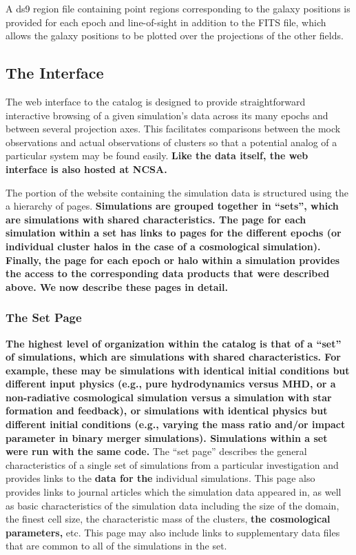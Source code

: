 \documentclass{emulateapj}
\begin{document}
A ds9 region file containing point regions corresponding to the galaxy positions is provided for each epoch and line-of-sight in addition to the FITS file, which allows the galaxy positions to be plotted over the projections of the other fields.

\subsection{The Interface}\label{sec:interface}

The web interface to the catalog is designed to provide straightforward interactive browsing of a given simulation's data across its many epochs and between several projection axes. This facilitates comparisons between the mock observations and actual observations of clusters so that a potential analog of a particular system may be found easily. \textbf{Like the data itself, the web interface is also hosted at NCSA.}

The portion of the website containing the simulation data is structured using the a hierarchy of pages. {\bf Simulations are grouped together in ``sets'', which are simulations with shared characteristics. The page for each simulation within a set has links to pages for the different epochs (or individual cluster halos in the case of a cosmological simulation). Finally, the page for each epoch or halo within a simulation provides the access to the corresponding data products that were described above. We now describe these pages in detail.}

\subsubsection{The Set Page}\label{sec:set_page}

{\bf The highest level of organization within the catalog is that of a ``set'' of simulations, which are simulations with shared characteristics. For example, these may be simulations with identical initial conditions but different input physics (e.g., pure hydrodynamics versus MHD, or a non-radiative cosmological simulation versus a simulation with star formation and feedback), or simulations with identical physics but different initial conditions (e.g., varying the mass ratio and/or impact parameter in binary merger simulations). Simulations within a set were run with the same code.} The ``set page'' describes the general characteristics of a single set of simulations from a particular investigation and provides links to the {\bf data for the} individual simulations. This page also provides links to journal articles which the simulation data appeared in, as well as basic characteristics of the simulation data including the size of the domain, the finest cell size, the characteristic mass of the clusters, {\bf the cosmological parameters,} etc. This page may also include links to supplementary data files that are common to all of the simulations in the set.
\end{document}
